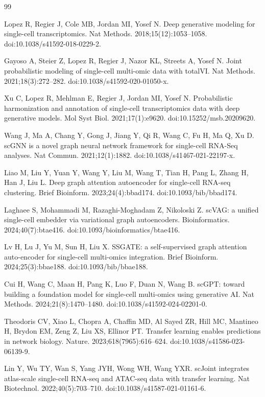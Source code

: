 \documentclass[referee, pdflatex, sn-vancouver-num]{sn-jnl}
\begin{document}
\begin{thebibliography}{99}

Lopez R, Regier J, Cole MB, Jordan MI, Yosef N. Deep generative modeling for single-cell transcriptomics. Nat Methods. 2018;15(12):1053--1058. doi:10.1038/s41592-018-0229-2.

Gayoso A, Steier Z, Lopez R, Regier J, Nazor KL, Streets A, Yosef N. Joint probabilistic modeling of single-cell multi-omic data with totalVI. Nat Methods. 2021;18(3):272--282. doi:10.1038/s41592-020-01050-x.

Xu C, Lopez R, Mehlman E, Regier J, Jordan MI, Yosef N. Probabilistic harmonization and annotation of single-cell transcriptomics data with deep generative models. Mol Syst Biol. 2021;17(1):e9620. doi:10.15252/msb.20209620.

Wang J, Ma A, Chang Y, Gong J, Jiang Y, Qi R, Wang C, Fu H, Ma Q, Xu D. scGNN is a novel graph neural network framework for single-cell RNA-Seq analyses. Nat Commun. 2021;12(1):1882. doi:10.1038/s41467-021-22197-x.

Liao M, Liu Y, Yuan Y, Wang Y, Liu M, Wang T, Tian H, Pang L, Zhang H, Han J, Liu L. Deep graph attention autoencoder for single-cell RNA-seq clustering. Brief Bioinform. 2023;24(4):bbad174. doi:10.1093/bib/bbad174.

Laghaee S, Mohammadi M, Razaghi-Moghadam Z, Nikoloski Z. scVAG: a unified single-cell embedder via variational graph autoencoders. Bioinformatics. 2024;40(7):btae416. doi:10.1093/bioinformatics/btae416.

Lv H, Lu J, Yu M, Sun H, Liu X. SSGATE: a self-supervised graph attention auto-encoder for single-cell multi-omics integration. Brief Bioinform. 2024;25(3):bbae188. doi:10.1093/bib/bbae188.

Cui H, Wang C, Maan H, Pang K, Luo F, Duan N, Wang B. scGPT: toward building a foundation model for single-cell multi-omics using generative AI. Nat Methods. 2024;21(8):1470--1480. doi:10.1038/s41592-024-02201-0.

Theodoris CV, Xiao L, Chopra A, Chaffin MD, Al Sayed ZR, Hill MC, Mantineo H, Brydon EM, Zeng Z, Liu XS, Ellinor PT. Transfer learning enables predictions in network biology. Nature. 2023;618(7965):616--624. doi:10.1038/s41586-023-06139-9.

Lin Y, Wu TY, Wan S, Yang JYH, Wong WH, Wang YXR. scJoint integrates atlas-scale single-cell RNA-seq and ATAC-seq data with transfer learning. Nat Biotechnol. 2022;40(5):703--710. doi:10.1038/s41587-021-01161-6.


\end{thebibliography}
\end{document}
